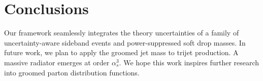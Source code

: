 \section{Conclusions}\label{sec:conclusions}

Our framework seamlessly integrates the theory uncertainties of a family
of uncertainty-aware sideband events and power-suppressed soft drop
masses. In future work, we plan to apply the groomed jet mass to trijet
production. A massive radiator emerges at order $\alpha_s^3$. We hope
this work inspires further research into groomed parton distribution
functions.

